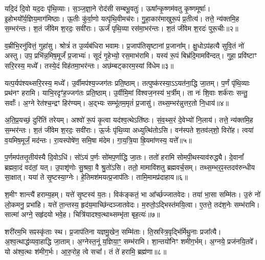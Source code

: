 यदि॒दं दि॒वो यद॒दः पृ॑थि॒व्याः।
स॒ञ्ज॒ज्ञा॒ने रोद॑सी सम्बभू॒वतुः॑।
ऊषा᳚न्कृ॒ष्णम॑वतु कृ॒ष्णमूषाः᳚।
इ॒होभयो᳚र्य॒ज्ञिय॒\-माग॑मिष्ठाः।
ऊ॒तीः कु॑र्वा॒णो यत्पृ॑थि॒वीमच॑रः।
गु॒हा॒कार॑माखुरू॒पं प्र॒तीत्य॑।
तत्ते॒ न्य॑क्तमि॒ह स॒म्भर॑न्तः।
श॒तं जी॑वेम श॒रदः॒ सवी॑राः।
ऊर्जं॑ पृथि॒व्या रस॑मा॒भर॑न्तः।
श॒तं जी॑वेम श॒रदः॑ पुरू॒चीः॥२॥\ip

व॒म्रीभि॒रनु॑\-वित्तं॒ गुहा॑सु।
श्रोत्रं॑ त उ॒र्व्यब॑धिरा भवामः।
प्र॒जा\-प॑तिसृष्टानां प्र॒जाना᳚म्।
क्षु॒धो\-ऽप॑हत्यै सुवि॒तं नो॑ अस्तु।
उप॒ प्रभि॑न्न॒मिष॒मूर्जं॑ प्र॒जाभ्यः॑।
सूदं॑ गृ॒हेभ्यो॒ रस॒माभ॑रामि।
यस्य॑ रू॒पं बिभ्र॑दि॒मामवि॑न्दत्।
गुहा॒ प्रवि॑ष्टाꣳ सरि॒रस्य॒ मध्ये᳚।
तस्ये॒दं विह॑तमा॒भर॑न्तः।
अछ॑म्बट्कारम॒स्यां वि॑धेम॥३॥\ip

यत्प॒र्यप॑श्यथ्सरि॒रस्य॒ मध्ये᳚।
उ॒र्वीमप॑श्य॒ज्जग॑तः प्रति॒ष्ठाम्।
तत्पुष्क॑रस्या॒ऽऽयत॑ना॒द्धि जा॒तम्।
प॒र्णं पृ॑थि॒व्याः प्रथ॑नꣳ हरामि।
याभि॒रदृꣳ॑ह॒ज्जग॑तः प्रति॒ष्ठाम्।
उ॒र्वीमि॒मां वि॑श्वज॒नस्य॑ भ॒र्त्रीम्।
ता नः॑ शि॒वाः शर्क॑राः सन्तु॒ सर्वाः᳚।
अ॒ग्ने रेत॑श्च॒न्द्रꣳ हिर॑ण्यम्।
अ॒द्भ्यः सम्भू॑तम॒मृतं॑ प्र॒जासु॑।
तथ्स॒म्भर॑न्नुत्तर॒तो नि॒धाय॑॥४॥\ip

अ॒ति॒प्र॒यच्छं॒ दुरि॑तिं तरेयम्।
अश्वो॑ रू॒पं कृ॒त्वा यद॑श्व॒त्थे\-ऽति॑ष्ठः।
सं॒व॒थ्स॒रं दे॒वेभ्यो॑ नि॒लाय॑।
तत्ते॒ न्य॑क्तमि॒ह स॒म्भर॑न्तः।
श॒तं जी॑वेम श॒रदः॒ सवी॑राः।
ऊ॒र्जः पृ॑थि॒व्या अध्युत्थि॑तोऽसि।
वन॑स्पते श॒तव॑ल्‌शो॒ विरो॑ह।
त्वया॑ व॒यमिष॒मूर्जं॒ मद॑न्तः।
रा॒यस्पोषे॑ण॒ समि॒षा म॑देम।
गा॒य॒त्रि॒या ह्रि॒यमा॑णस्य॒ यत्ते᳚॥५॥\ip

प॒र्णमप॑तत्तृ॒तीय॑स्यै दि॒वोऽधि॑।
सो॑ऽयं प॒र्णः सो॑मप॒र्णाद्धि जा॒तः।
ततो॑ हरामि सोमपी॒थस्या\-व॑\-रुद्ध्यै।
दे॒वानां᳚ ब्रह्मवा॒दं वद॑तां॒ यत्।
उ॒पाशृ॑णोः सु॒श्रवा॒ वै श्रु॒तो॑ऽसि।
ततो॒ मामावि॑शतु ब्रह्मवर्च॒सम्।
तथ्स॒म्भर॒ꣴ॒स्तदव॑रुन्धीय सा॒क्षात्।
यया॑ ते सृ॒ष्टस्या॒ग्नेः।
हे॒तिमश॑मयत्प्र॒जा\-प॑तिः।
तामि॒मामप्र॑दाहाय॥६॥\ip

श॒मीꣳ शान्त्यै॑ हराम्य॒हम्।
यत्ते॑ सृ॒ष्टस्य॑ य॒तः।
विक॑ङ्कतं॒ भा आ᳚र्च्छज्जातवेदः।
तया॑ भा॒सा सम्मि॑तः।
उ॒रुं नो॑ लो॒कमनु॒ प्रभा॑हि।
यत्ते॑ ता॒न्तस्य॒ हृद॑य॒माच्छि॑न्दञ्जातवेदः।
म॒रुतो॒\-ऽद्भिस्त॑मयि॒त्वा।
ए॒तत्ते॒ तद॑श॒नेः सम्भ॑रामि।
सात्मा॑ अग्ने॒ सहृ॑दयो भवे॒ह।
चित्रि॑यादश्व॒त्थाथ्सम्भृ॑ता बृह॒त्यः॑॥७॥\ip

शरी॑रम॒भि सꣴस्कृ॑ताः स्थ।
प्र॒जा\-प॑तिना यज्ञमु॒खेन॒ सम्मि॑ताः।
ति॒स्रस्त्रि॒वृद्भि॑र्मिथु॒नाः प्रजा᳚त्यै।
अ॒श्व॒त्थाद्ध॑व्य\-वा॒हाद्धि जा॒ताम्।
अ॒ग्नेस्त॒नूं य॒ज्ञिया॒ꣳ॒ सम्भ॑रामि।
शा॒न्तयो॑निꣳ शमीग॒र्भम्।
अ॒ग्नये॒ प्रज॑नयि॒तवे᳚।
यो अ॑श्व॒त्थः श॑मीग॒र्भः।
आ॒रु॒रोह॒ त्वे सचा᳚।
तं ते॑ हरामि॒ ब्रह्म॑णा॥८॥\ip

